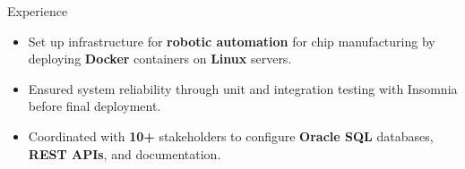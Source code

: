 \documentclass{resume} %
\begin{document}
\begin{workSection}{Experience}
	\experienceItem[
	company=Texas Instruments,
	location=Dallas{,} TX,
	position=Information Technology Intern,
	duration= May 2024 - August 2024,
	]
	\begin{itemize}
		\vspace{-0.5em}
		\itemsep -6pt {}
		\item Set up infrastructure for \textbf{robotic automation} for chip manufacturing by deploying \textbf{Docker} containers on \textbf{Linux} servers.
		\item Ensured system reliability through unit and integration testing with Insomnia before final deployment.
		\item Coordinated with \textbf{10+} stakeholders to configure \textbf{Oracle SQL} databases, \textbf{REST APIs}, and documentation.
	\end{itemize}
	

\end{workSection}
\end{document}
